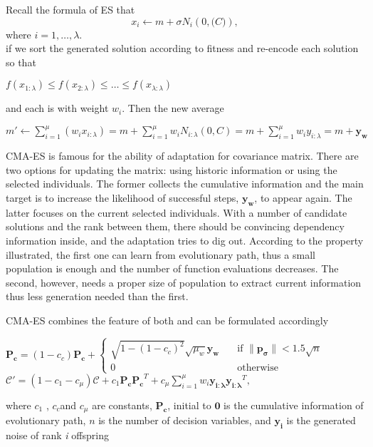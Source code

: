   Recall the formula of ES that \[ x_i \leftarrow m + \sigma
  N_i\left(0,\mathcal(C)\right),\] where $i = 1,\ldots,\lambda.$\\ if we
  sort the generated solution according to fitness and re-encode each
  solution so that \begin{center} $f(x_{1:\lambda}) \leq
    f(x_{2:\lambda}) \leq \ldots \leq f(x_{\lambda:\lambda})$
  \end{center} and each is with weight $w_i$. Then the new average
  \begin{center} $m' \leftarrow \sum\limits_{i=1}^{\mu} \left(w_i
    x_{i:\lambda}\right) = m + \sum\limits_{i=1}^{\mu}w_i
    N_{i:\lambda}(0,C) = m + \sum\limits_{i=1}^{\mu}w_i y_{i:\lambda} =
    m + \mathbf{y_w}$ \end{center} CMA-ES is famous for the ability of
  adaptation for covariance matrix.  There are two options for updating
  the matrix: using historic information or using the selected
  individuals.  The former collects the cumulative information and the
  main target is to increase the likelihood of successful steps,
  $\mathbf{y_w}$, to appear again.  The latter focuses on the current
  selected individuals.  With a number of candidate solutions and the
  rank between them, there should be convincing dependency information
  inside, and the adaptation tries to dig out.  According to the
  property illustrated, the first one can learn from evolutionary path,
  thus a small population is enough and the number of function
  evaluations decreases.  The second, however, needs a proper size of
  population to extract current information  thus less generation needed
  than the first.

      CMA-ES combines the feature of both and can be formulated
      accordingly 
      \begin{center} 
        $\mathbf{{P_c}} = (1-c_c)\mathbf{{P_c}}+\left\{
          \begin{array}{ll}
          \sqrt{1-{\left(1-c_c\right)}^2}\sqrt{\mu_w}{\mathbf{y_w}} &
          \quad \text{if $\|\mathbf{p_{\sigma}}\| < 1.5\sqrt{n}$}\\ 0 &
          \quad \text{otherwise }
        \end{array}
        \right.$\\ $\mathcal{C}' = (1-c_1-c_{\mu})\mathcal{C} +
        c_1{\mathbf{P_c}}{\mathbf{P_c}}^T +
        c_{\mu}\sum\limits_{i=1}^{\mu}
        w_i\mathbf{y_{i:\lambda}}\mathbf{y_{i:\lambda}}^T, $ 
      \end{center}
      where $c_1$ , $c_c$and $c_{\mu}$ are constants, $\mathbf{P_c}$,
      initial to $\mathbf{0}$ is the cumulative information of
      evolutionary path, $n$ is the number of decision variables, and
      $\mathbf{y_i}$ is the generated noise of rank \textit{i} offspring

